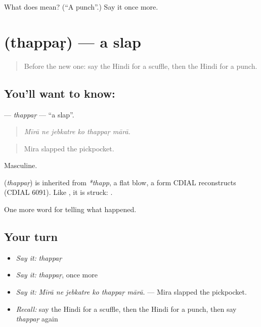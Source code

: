 \begin{tcolorbox}[breakable,colback=teal!4,colframe=teal!35!black,title={Before you move on}]
What does  mean? (\textquotedblleft{}A punch\textquotedblright{}.) Say it once more.
\end{tcolorbox}
\section[\texorpdfstring{\hi{थप्पड़} (thappaṛ)}{थप्पड़ (thappaṛ)}]{ (thappaṛ) — a slap}

\label{lesson:HI-C319-thappar}



\begin{quote}
Before the new one: say the Hindi for a scuffle, then the Hindi for a punch.
\end{quote}

\subsection*{You'll want to know: }
\textbf{} — \emph{thappaṛ} — \textquotedblleft{}a slap\textquotedblright{}.

\begin{quote}
     
\end{quote}

\begin{quote}
\emph{Mīrā ne jebkatre ko thappaṛ mārā.}
\end{quote}

\begin{quote}
Mira slapped the pickpocket.
\end{quote}

Masculine.

\begin{cousinweb}
\textbf{} (\emph{thappaṛ}) is inherited from \emph{*thapp}, a flat blow, a form CDIAL reconstructs (CDIAL 6091). Like \textbf{}, it is struck: \textbf{ }.
\end{cousinweb}

\begin{grammarlens}[title={What you've built}]
One more word for telling what happened.
\end{grammarlens}

\subsection*{Your turn}
\begin{itemize}
\raggedright
  \item \emph{Say it:} \emph{thappaṛ}
  \item \emph{Say it:} \emph{thappaṛ}, once more
  \item \emph{Say it:} \emph{Mīrā ne jebkatre ko thappaṛ mārā.} — Mira slapped the pickpocket.
  \item \emph{Recall:} say the Hindi for a scuffle, then the Hindi for a punch, then say \emph{thappaṛ} again
\end{itemize}

